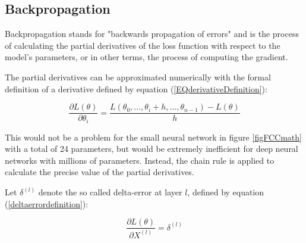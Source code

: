 \documentclass[a4paper, twoside]{article}
\newcommand*{\pd}[2]{\ensuremath{\dfrac{\partial #1}{\partial #2}}}
\newcommand*{\inpd}[2]{\ensuremath{\frac{\partial #1}{\partial #2}}}
\begin{document}
\subsection{Backpropagation}
Backpropagation stands for "backwards propagation of errors" and is the process of calculating the partial derivatives of the loss function with respect to the model's parameters, or in other terms, the process of computing the gradient. \cite{wikiStanford} \cite{gradient}

The partial derivatives can be approximated numerically with the formal definition of a derivative defined by equation (\ref{EQderivativeDefinition}): \cite{wikiStanford} \cite{gradient}

\begin{equation}\label{EQderivativeDefinition}
\pd{L(\theta)}{\theta_{i}} = \frac{L(\theta_{0},...,\theta_{i} + h, ..., \theta_{n-1})-L(\theta)}{h}
\end{equation}

This would not be a problem for the small neural network in figure \ref{figFCCmath} with a total of 24 parameters, but would be extremely inefficient for deep neural networks with millions of parameters. Instead, the chain rule is applied to calculate the precise value of the partial derivatives. \cite{cs231n}

Let $\delta^{(l)}$ denote the so called delta-error at layer $l$, defined by equation (\ref{deltaerrordefinition}):

\begin{equation}\label{deltaerrordefinition}
\inpd{L(\theta)}{X^{(l)}} = \delta^{(l)}
\end{equation}
\end{document}
